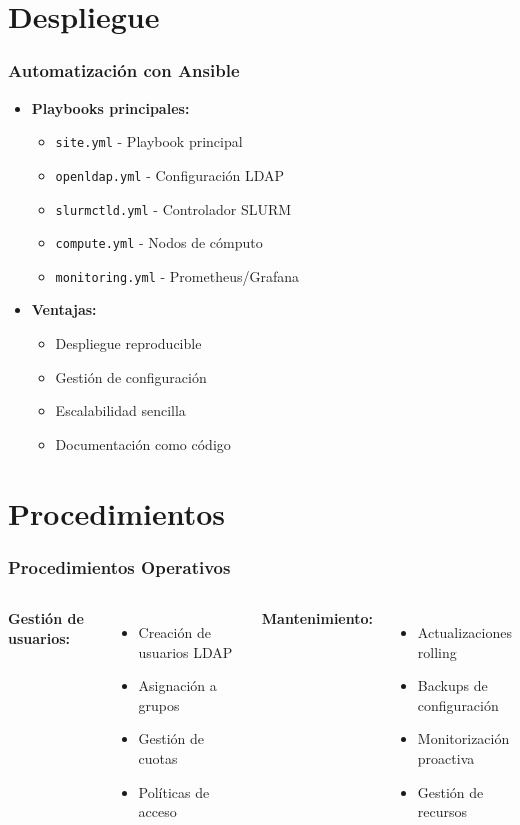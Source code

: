 \documentclass[aspectratio=169]{beamer}
\begin{document}
\section{Despliegue}

\begin{frame}
\frametitle{Automatización con Ansible}
\begin{itemize}
    \item \textbf{Playbooks principales:}
    \begin{itemize}
        \item \texttt{site.yml} - Playbook principal
        \item \texttt{openldap.yml} - Configuración LDAP
        \item \texttt{slurmctld.yml} - Controlador SLURM
        \item \texttt{compute.yml} - Nodos de cómputo
        \item \texttt{monitoring.yml} - Prometheus/Grafana
    \end{itemize}
    \item \textbf{Ventajas:}
    \begin{itemize}
        \item Despliegue reproducible
        \item Gestión de configuración
        \item Escalabilidad sencilla
        \item Documentación como código
    \end{itemize}
\end{itemize}
\end{frame}

\section{Procedimientos}

\begin{frame}
\frametitle{Procedimientos Operativos}
\begin{columns}
\textbf{Gestión de usuarios:}
\begin{itemize}
    \item Creación de usuarios LDAP
    \item Asignación a grupos
    \item Gestión de cuotas
    \item Políticas de acceso
\end{itemize}

\textbf{Mantenimiento:}
\begin{itemize}
    \item Actualizaciones rolling
    \item Backups de configuración
    \item Monitorización proactiva
    \item Gestión de recursos
\end{itemize}
\end{columns}
\end{frame}
\end{document}
